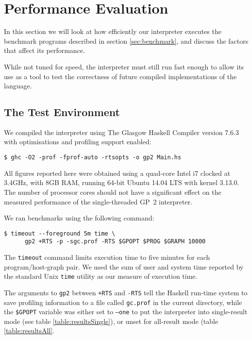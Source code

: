 \section{Performance Evaluation}
\label{sec:performanceevaluation}

In this section we will look at how efficiently our interpreter executes the benchmark programs described in section \ref{sec:benchmark}, and discuss the factors that affect its performance.

While not tuned for speed, the interpreter must still run fast enough to allow its use as a tool to test the correctness of future compiled implementations of the language.




\subsection{The Test Environment}

We compiled the interpreter using The Glasgow Haskell Compiler\cite{ghc} version 7.6.3 with optimisations and profiling support enabled:

\begin{verbatim}
$ ghc -O2 -prof -fprof-auto -rtsopts -o gp2 Main.hs
\end{verbatim}

All figures reported here were obtained using a quad-core Intel i7 clocked at 3.4GHz, with 8GB RAM, running 64-bit Ubuntu 14.04 LTS with kernel 3.13.0. The number of processor cores should not have a significant effect on the measured performance of the single-threaded GP~2 interpreter.

We ran benchmarks using the following command:

\begin{verbatim}
$ timeout --foreground 5m time \
      gp2 +RTS -p -sgc.prof -RTS $GPOPT $PROG $GRAPH 10000
\end{verbatim}

The \texttt{timeout} command limits execution time to five minutes for each program/host-graph pair. We used the sum of user and system time reported by the standard Unix \texttt{time} utility as our measure of execution time.

The arguments to \texttt{gp2} between \texttt{+RTS} and \texttt{-RTS} tell the Haskell run-time system to save profiling information to a file called \texttt{gc.prof} in the current directory, while the \texttt{\$GPOPT} variable was either set to \texttt{--one} to put the interpreter into single-result mode (see table \ref{table:resultsSingle}), or unset for all-result mode (table \ref{table:resultsAll}.

